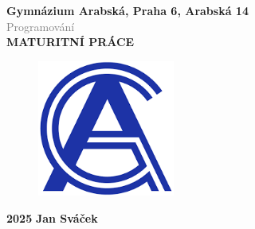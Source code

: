 \begin{titlepage}
    \begin{center}
        \vspace*{1cm}

        {\LARGE \textbf{Gymnázium Arabská, Praha 6, Arabská 14}} \\
        \vspace{0.5cm}
        \textcolor{gray}{\large Programování}
        \vspace{2cm}\\
        {\LARGE \textbf{MATURITNÍ PRÁCE}}\\
        \vspace{2cm}
        \vspace{1.5cm}
        \begin{figure}[h]
            \centering
            \includegraphics[width = 0.4\textwidth]{images/gyarablogo.png}
        \end{figure}
        \vspace{7.25cm}
        {\large \textbf{2025}}
        \hspace{11cm}
        {\large \textbf{Jan Sváček}}
        
    \end{center}
\end{titlepage}

